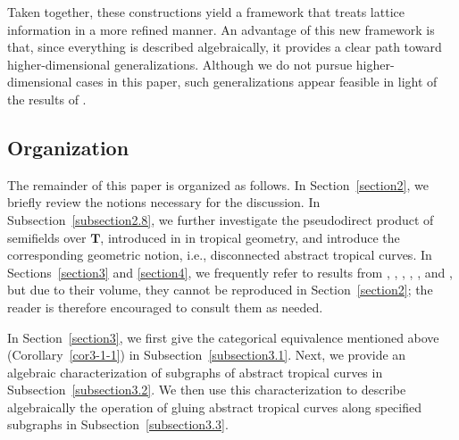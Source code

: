 \documentclass[a4paper,12pt]{amsart}
\begin{document}
Taken together, these constructions yield a framework that treats lattice information in a more refined manner.
An advantage of this new framework is that, since everything is described algebraically, it provides a clear path toward higher-dimensional generalizations.
Although we do not pursue higher-dimensional cases in this paper, such generalizations appear feasible in light of the results of \cite{Amini=Kawaguchi=Song}.

\subsection*{Organization}

The remainder of this paper is organized as follows.
In Section~\ref{section2}, we briefly review the notions necessary for the discussion.
In Subsection~\ref{subsection2.8}, we further investigate the pseudodirect product of semifields over $\boldsymbol{T}$, introduced in \cite{JuAe=Nakajima} in tropical geometry, and introduce the corresponding geometric notion, i.e., disconnected abstract tropical curves.
In Sections~\ref{section3} and \ref{section4}, we frequently refer to results from \cite{JuAe3}, \cite{JuAe}, \cite{JuAe2}, \cite{JuAe5}, \cite{JuAe4}, and \cite{JuAe=Nakajima}, but due to their volume, they cannot be reproduced in Section~\ref{section2}; the reader is therefore encouraged to consult them as needed.

In Section~\ref{section3}, we first give the categorical equivalence mentioned above (Corollary~\ref{cor3-1-1}) in Subsection~\ref{subsection3.1}.
Next, we provide an algebraic characterization of subgraphs of abstract tropical curves in Subsection~\ref{subsection3.2}.
We then use this characterization to describe algebraically the operation of gluing abstract tropical curves along specified subgraphs in Subsection~\ref{subsection3.3}.
\end{document}
